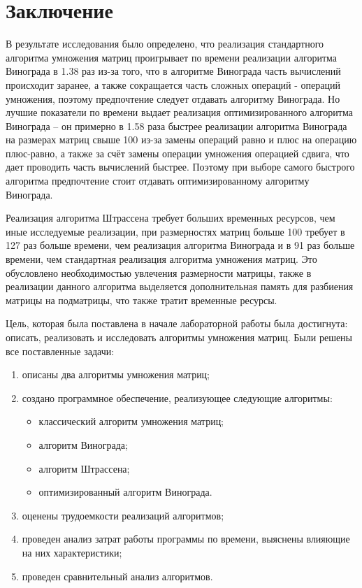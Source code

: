 \chapter*{Заключение}

В результате исследования было определено, что реализация стандартного алгоритма умножения матриц проигрывает по времени реализации алгоритма Винограда  в 1.38 раз из-за того, что в алгоритме Винограда часть вычислений происходит заранее, а также сокращается часть сложных операций - операций умножения, поэтому предпочтение следует отдавать алгоритму Винограда. 
Но лучшие показатели по времени выдает реализация оптимизированного алгоритма Винограда -- он примерно в 1.58 раза быстрее реализации алгоритма Винограда на размерах матриц свыше 100 из-за замены операций равно и плюс на операцию плюс-равно, а также за счёт замены операции умножения операцией сдвига, что дает проводить часть вычислений быстрее. 
Поэтому при выборе самого быстрого алгоритма предпочтение стоит отдавать оптимизированному алгоритму Винограда. 

Реализация алгоритма Штрассена требует больших временных ресурсов, чем иные исследуемые реализации, при размерностях матриц больше 100 требует в 127 раз больше времени, чем реализация алгоритма Винограда и в 91 раз больше времени, чем стандартная реализация алгоритма умножения матриц. Это обусловлено необходимостью увлечения размерности матрицы, также в реализации данного алгоритма выделяется дополнительная память для разбиения матрицы на подматрицы, что также тратит временные ресурсы.

Цель, которая была поставлена в начале лабораторной работы была достигнута: описать, реализовать и исследовать алгоритмы умножения матриц.
Были решены все поставленные задачи:
\begin{enumerate}[label={\arabic*)}]
	\item описаны два алгоритмы умножения матриц;
	\item создано программное обеспечение, реализующее следующие алгоритмы:
	\begin{itemize}[label=---]
		\item классический алгоритм умножения матриц;
		\item алгоритм Винограда;
		\item алгоритм Штрассена;
		\item оптимизированный алгоритм Винограда.
	\end{itemize}
	\item оценены трудоемкости реализаций алгоритмов;
	\item проведен анализ затрат работы программы по времени, выяснены влияющие на них характеристики;
	\item проведен сравнительный анализ алгоритмов.
\end{enumerate}
